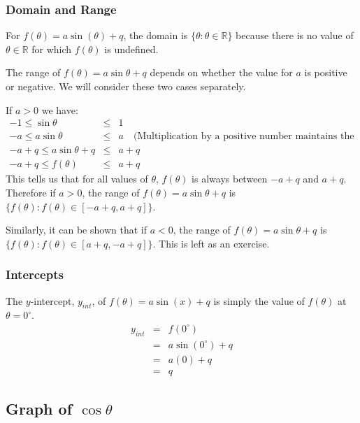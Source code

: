 \documentclass[10pt,a4paper,titlepage,twoside,openright]{report}
\begin{document}
\subsubsection{Domain and Range}
For $f(\theta)=a \sin(\theta) + q$, the domain is $\{\theta:\theta\in\mathbb{R}\}$ because there is no value of $\theta \in \mathbb{R}$ for which $f(\theta)$ is undefined.

The range of $f(\theta)=a\sin \theta +q$ depends on whether the value for $a$ is positive or negative. We will consider these two cases separately.

If $a>0$ we have:
\begin{eqnarray*}
-1 \le\sin \theta&\le& 1 \\
-a \le a \sin \theta&\le& a \quad \mbox{(Multiplication by a positive number maintains the nature of the inequality)} \\
-a+q \le a \sin \theta + q&\le& a+q\\
-a+q \le f(\theta) &\le& a+q
\end{eqnarray*}
This tells us that for all values of $\theta$, $f(\theta)$ is always between $-a+q$ and $a+q$. Therefore if $a>0$, the range of $f(\theta)=a \sin \theta + q$ is $\{f(\theta):f(\theta)\in[-a+q,a+q]\}$.

Similarly, it can be shown that if $a<0$, the range of $f(\theta)=a \sin \theta + q$ is $\{f(\theta):f(\theta)\in[a+q,-a+q]\}$. This is left as an exercise.


\subsubsection{Intercepts}
The $y$-intercept, $y_{int}$, of $f(\theta)=a \sin(x) + q$ is simply the value of  $f(\theta)$ at $\theta=0^\circ$.
\begin{eqnarray*}
y_{int}&=&f(0^\circ)\\
&=&a \sin(0^\circ) + q\\
&=&a(0)+q\\
&=&q
\end{eqnarray*}

\subsection{Graph of $\cos \theta$}
\end{document}
